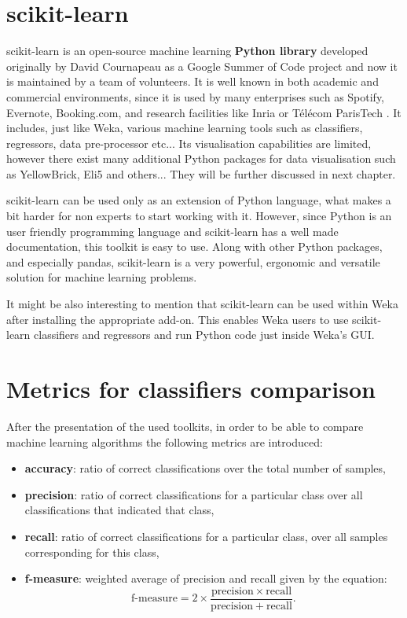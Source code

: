 \section{scikit-learn}
scikit-learn is an open-source machine learning \textbf{Python library} developed originally by David Cournapeau as a Google Summer of Code project and now it is maintained by a team of volunteers. It is well known in both academic and commercial environments, since it is used by many enterprises such as Spotify, Evernote, Booking.com, and research facilities like Inria or Télécom ParisTech \cite{noauthor_who_nodate}. It includes, just like Weka, various machine learning tools such as classifiers, regressors, data pre-processor etc... Its visualisation capabilities are limited, however there exist many additional Python packages for data visualisation such as YellowBrick, Eli5 and others... They will be further discussed in next chapter.

scikit-learn can be used only as an extension of Python language, what makes a bit harder for non experts to start working with it. However, since Python is an user friendly programming language and scikit-learn has a well made documentation, this toolkit is easy to use. Along with other Python packages, and especially pandas, scikit-learn is a very powerful, ergonomic and versatile solution for machine learning problems.  

It might be also interesting to mention that scikit-learn can be used within Weka after installing the appropriate add-on. This enables Weka users to use scikit-learn classifiers and regressors and run Python code just inside Weka's GUI.

\section{Metrics for classifiers comparison}
After the presentation of the used toolkits, in order to be able to compare machine learning algorithms the following metrics are introduced:
\begin{itemize}
    \item \textbf{accuracy}: ratio of correct classifications over the total number of samples,
    \item \textbf{precision}:  ratio of correct classifications for a particular class over all classifications that indicated that class,
    \item \textbf{recall}: ratio of correct classifications for a particular class, over all samples corresponding for this class,
    \item \textbf{f-measure}: weighted average of precision and recall given by the equation: 
    \begin{equation*}
        \text{f-measure} = 2 \times \frac{\mathrm{precision} \times \mathrm{recall}}{\mathrm{precision} + \mathrm{recall}}.
    \end{equation*}
\end{itemize}

